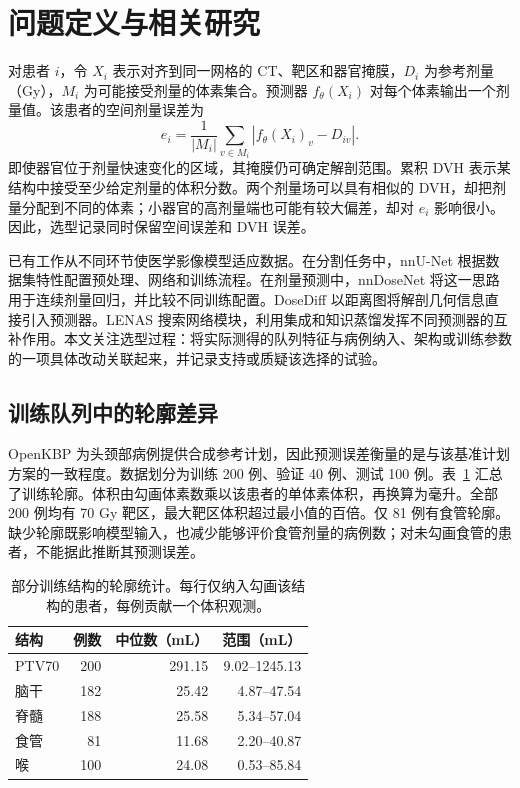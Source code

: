 \documentclass[UTF8,letterpaper,twocolumn,11pt,fontset=fandol]{ctexart}
\begin{document}
\section{问题定义与相关研究}
对患者 $i$，令 $X_i$ 表示对齐到同一网格的 CT、靶区和器官掩膜，$D_i$ 为参考剂量（Gy），$M_i$ 为可能接受剂量的体素集合。预测器 $f_\theta(X_i)$ 对每个体素输出一个剂量值。该患者的空间剂量误差为
\begin{equation}
 e_i=\frac{1}{|M_i|}\sum_{v\in M_i}
 \left|f_\theta(X_i)_v-D_{iv}\right|.
\end{equation}
即使器官位于剂量快速变化的区域，其掩膜仍可确定解剖范围。累积 DVH 表示某结构中接受至少给定剂量的体积分数。两个剂量场可以具有相似的 DVH，却把剂量分配到不同的体素；小器官的高剂量端也可能有较大偏差，却对 $e_i$ 影响很小。因此，选型记录同时保留空间误差和 DVH 误差。

已有工作从不同环节使医学影像模型适应数据。在分割任务中，nnU-Net 根据数据集特性配置预处理、网络和训练流程\citep{nnunet}。在剂量预测中，nnDoseNet 将这一思路用于连续剂量回归，并比较不同训练配置\citep{nndose}。DoseDiff 以距离图将解剖几何信息直接引入预测器\citep{dosediff}。LENAS 搜索网络模块，利用集成和知识蒸馏发挥不同预测器的互补作用\citep{lenas}。本文关注选型过程：将实际测得的队列特征与病例纳入、架构或训练参数的一项具体改动关联起来，并记录支持或质疑该选择的试验。

\subsection{训练队列中的轮廓差异}
OpenKBP 为头颈部病例提供合成参考计划，因此预测误差衡量的是与该基准计划方案的一致程度。数据划分为训练 200 例、验证 40 例、测试 100 例\citep{openkbp}。表~\ref{tab:cohort} 汇总了训练轮廓。体积由勾画体素数乘以该患者的单体素体积，再换算为毫升。全部 200 例均有 70 Gy 靶区，最大靶区体积超过最小值的百倍。仅 81 例有食管轮廓。缺少轮廓既影响模型输入，也减少能够评价食管剂量的病例数；对未勾画食管的患者，不能据此推断其预测误差。

\begin{table}[t]
\centering\small
\begin{tabular}{lrrr}
\toprule
结构 & 例数 & 中位数（mL） & 范围（mL）\\
\midrule
PTV70 & 200 & 291.15 & 9.02--1245.13\\
脑干 & 182 & 25.42 & 4.87--47.54\\
脊髓 & 188 & 25.58 & 5.34--57.04\\
食管 & 81 & 11.68 & 2.20--40.87\\
喉 & 100 & 24.08 & 0.53--85.84\\
\bottomrule
\end{tabular}
\caption{部分训练结构的轮廓统计。每行仅纳入勾画该结构的患者，每例贡献一个体积观测。}
\label{tab:cohort}
\end{table}
\end{document}
